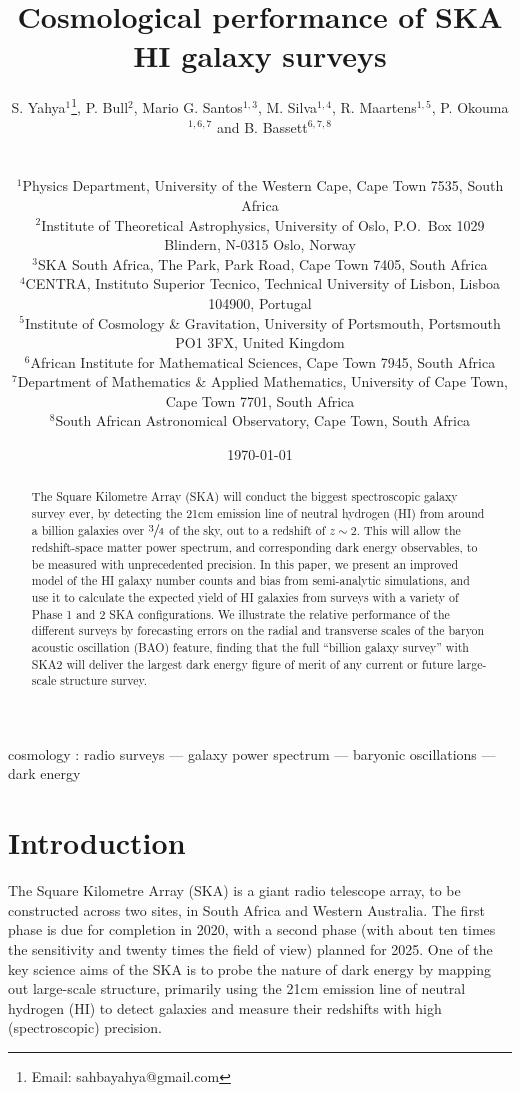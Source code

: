 \documentclass[useAMS,usenatbib]{mn2e}
\title[Cosmological performance of future SKA HI galaxy surveys]{Cosmological performance of SKA HI galaxy surveys}
\author[S. Yahya, P. Bull, M. G. Santos, M. Silva, R. Maartens, P. Okouma and B. Bassett ]{S. Yahya$^{1}$\footnotemark[0]\thanks{Email: sahbayahya@gmail.com},  
P. Bull$^2$, Mario G. Santos$^{1,3}$, M. Silva$^{1,4}$, R. Maartens$^{1,5}$,
 \newauthor  
P. Okouma$^{1,6,7}$ and B. Bassett$^{6,7,8}$
\\\\\\
$^{1}$Physics Department, University of the Western Cape, Cape Town 7535, South Africa\\
$^2$Institute of Theoretical Astrophysics, University of Oslo, P.O.\ Box 1029 Blindern, N-0315 Oslo, Norway \\
$^{3}$SKA South Africa, The Park, Park Road, Cape Town 7405, South Africa\\
$^{4}$CENTRA, Instituto Superior Tecnico, Technical University of Lisbon, Lisboa 104900, Portugal\\
$^5$Institute of Cosmology \& Gravitation, University of Portsmouth, Portsmouth PO1 3FX, United Kingdom\\
$^{6}$African Institute for Mathematical Sciences, Cape Town 7945, South Africa\\
$^{7}$Department of Mathematics \& Applied Mathematics, University of Cape Town, Cape Town 7701, South Africa\\
$^{8}$South African Astronomical Observatory, Cape Town, South Africa
}
\begin{document}
\date{\today}
\pagerange{\pageref{firstpage}--\pageref{LastPage}} 
\maketitle

\label{firstpage}
\begin{abstract}
The Square Kilometre Array (SKA) will conduct the biggest spectroscopic galaxy survey ever, by detecting the 21cm emission line of neutral hydrogen (HI) from around a billion galaxies over $\sfrac{3}{4}$ of the sky, out to a redshift of $z \sim 2$. This will allow the redshift-space matter power spectrum, and corresponding dark energy observables, to be measured with unprecedented precision.
In this paper, we present an improved model of the HI galaxy number counts and bias from semi-analytic simulations, and use it to calculate the expected yield of HI galaxies from surveys with a variety of Phase 1 and 2 SKA configurations. We illustrate the relative performance of the different surveys by forecasting errors on the radial and transverse scales of the baryon acoustic oscillation (BAO) feature, finding that the full ``billion galaxy survey'' with SKA2 will deliver the largest dark energy figure of merit of any current or future large-scale structure survey.

\end{abstract}

\begin{keywords}
cosmology : radio surveys --- galaxy power spectrum --- baryonic oscillations
--- dark energy
\end{keywords}


\section{Introduction}

The Square Kilometre Array (SKA) is a giant radio telescope array, to be constructed across two sites, in South Africa and Western Australia. The first phase is due for completion in 2020, with a second phase (with about ten times the sensitivity and twenty times the field of view) planned for 2025. One of the key science aims of the SKA is to probe the nature of dark energy by mapping out large-scale structure, primarily using the 21cm emission line of neutral hydrogen (HI) to detect galaxies and measure their redshifts with high (spectroscopic) precision.
\end{document}
